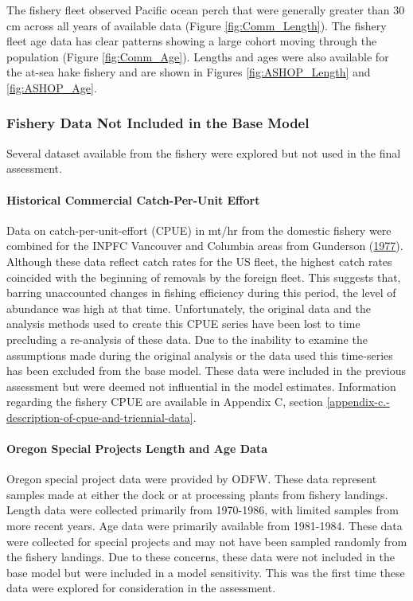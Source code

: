 \documentclass[12pt,]{article}
\let\oldparagraph\paragraph
\renewcommand{\paragraph}[1]{\oldparagraph{#1}\mbox{}}
\begin{document}
The fishery fleet observed Pacific ocean perch that were generally
greater than 30 cm across all years of available data (Figure
\ref{fig:Comm_Length}). The fishery fleet age data has clear patterns
showing a large cohort moving through the population (Figure
\ref{fig:Comm_Age}). Lengths and ages were also available for the at-sea
hake fishery and are shown in Figures \ref{fig:ASHOP_Length} and
\ref{fig:ASHOP_Age}.

\subsubsection{Fishery Data Not Included in the Base
Model}\label{fishery-data-not-included-in-the-base-model}

Several dataset available from the fishery were explored but not used in
the final assessment.

\paragraph{Historical Commercial Catch-Per-Unit
Effort}\label{historical-commercial-catch-per-unit-effort}

Data on catch-per-unit-effort (CPUE) in mt/hr from the domestic fishery
were combined for the INPFC Vancouver and Columbia areas from Gunderson
(\protect\hyperlink{ref-gunderson_population_1977}{1977}). Although
these data reflect catch rates for the US fleet, the highest catch rates
coincided with the beginning of removals by the foreign fleet. This
suggests that, barring unaccounted changes in fishing efficiency during
this period, the level of abundance was high at that time.
Unfortunately, the original data and the analysis methods used to create
this CPUE series have been lost to time precluding a re-analysis of
these data. Due to the inability to examine the assumptions made during
the original analysis or the data used this time-series has been
excluded from the base model. These data were included in the previous
assessment but were deemed not influential in the model estimates.
Information regarding the fishery CPUE are available in Appendix C,
section \ref{appendix-c.-description-of-cpue-and-triennial-data}.

\paragraph{Oregon Special Projects Length and Age
Data}\label{oregon-special-projects-length-and-age-data}

Oregon special project data were provided by ODFW. These data represent
samples made at either the dock or at processing plants from fishery
landings. Length data were collected primarily from 1970-1986, with
limited samples from more recent years. Age data were primarily
available from 1981-1984. These data were collected for special projects
and may not have been sampled randomly from the fishery landings. Due to
these concerns, these data were not included in the base model but were
included in a model sensitivity. This was the first time these data were
explored for consideration in the assessment.
\end{document}
